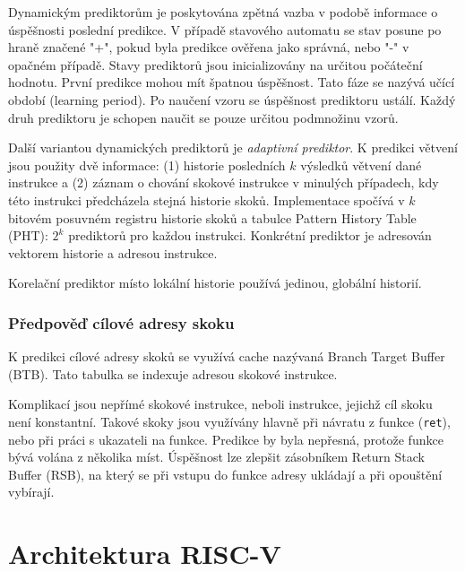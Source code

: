 Dynamickým prediktorům je poskytována zpětná vazba v podobě informace o úspěšnosti poslední predikce.
V případě stavového automatu se stav posune po hraně značené "+", pokud byla predikce ověřena jako správná, nebo "-" v opačném případě.
Stavy prediktorů jsou inicializovány na určitou počáteční hodnotu.
První predikce mohou mít špatnou úspěšnost.
Tato fáze se nazývá učící období (learning period).
Po naučení vzoru se úspěšnost prediktoru ustálí.
Každý druh prediktoru je schopen naučit se pouze určitou podmnožinu vzorů.

Další variantou dynamických prediktorů je \emph{adaptivní prediktor}.
K predikci větvení jsou použity dvě informace: (1) historie posledních $k$ výsledků větvení dané instrukce a (2) záznam o chování skokové instrukce v minulých případech, kdy této instrukci předcházela stejná historie skoků.
Implementace spočívá v $k$ bitovém posuvném registru historie skoků a tabulce Pattern History Table (PHT): $2^k$ prediktorů pro každou instrukci.
Konkrétní prediktor je adresován vektorem historie a adresou instrukce. \cite{adaptiveBranch}

Korelační prediktor místo lokální historie používá jedinou, globální historií.

\subsection{Předpověď cílové adresy skoku}

K predikci cílové adresy skoků se využívá cache nazývaná Branch Target Buffer (BTB).
Tato tabulka se indexuje adresou skokové instrukce.

Komplikací jsou nepřímé skokové instrukce, neboli instrukce, jejichž cíl skoku není konstantní.
Takové skoky jsou využívány hlavně při návratu z funkce (\texttt{ret}), nebo při práci s ukazateli na funkce.
Predikce by byla nepřesná, protože funkce bývá volána z několika míst.
Úspěšnost lze zlepšit zásobníkem Return Stack Buffer (RSB), na který se při vstupu do funkce adresy ukládají a při opouštění vybírají.


\chapter{Architektura RISC-V}

